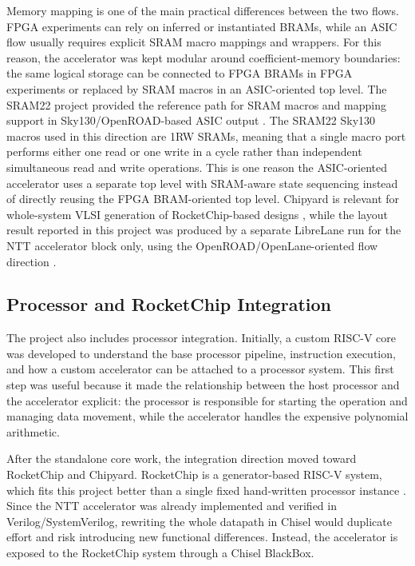 \documentclass[a4paper, 12pt, titlepage]{article}
\begin{document}
Memory mapping is one of the main practical differences between the two flows.
FPGA experiments can rely on inferred or instantiated BRAMs, while an ASIC flow
usually requires explicit SRAM macro mappings and wrappers. For this reason,
the accelerator was kept modular around coefficient-memory boundaries: the same
logical storage can be connected to FPGA BRAMs in FPGA experiments or replaced
by SRAM macros in an ASIC-oriented top level. The SRAM22 project provided the
reference path for SRAM macros and mapping support in Sky130/OpenROAD-based
ASIC output \cite{sram22}. The SRAM22 Sky130 macros used in this direction are
1RW SRAMs, meaning that a single macro port performs either one read or one
write in a cycle rather than independent simultaneous read and write
operations. This is one reason the ASIC-oriented accelerator uses a separate top
level with SRAM-aware state sequencing instead of directly reusing the FPGA
BRAM-oriented top level. Chipyard is relevant for whole-system VLSI generation
of RocketChip-based designs \cite{chipyard}, while the layout result reported
in this project was produced by a separate LibreLane run for the NTT
accelerator block only, using the OpenROAD/OpenLane-oriented flow direction
\cite{openlane}.

\subsection{Processor and RocketChip Integration}

The project also includes processor integration. Initially, a custom
RISC-V core was developed to understand the base processor pipeline, instruction
execution, and how a custom accelerator can be attached to a processor system.
This first step was useful because it made the relationship between the host
processor and the accelerator explicit: the processor is responsible for
starting the operation and managing data movement, while the accelerator handles
the expensive polynomial arithmetic.

After the standalone core work, the integration direction moved toward
RocketChip and Chipyard. RocketChip is a generator-based RISC-V system, which
fits this project better than a single fixed hand-written processor instance
\cite{rocket-chip, chipyard}. Since the NTT accelerator was already
implemented and verified in Verilog/SystemVerilog, rewriting the whole datapath
in Chisel would duplicate effort and risk introducing new functional
differences. Instead, the accelerator is exposed to the RocketChip system
through a Chisel BlackBox.
\end{document}
